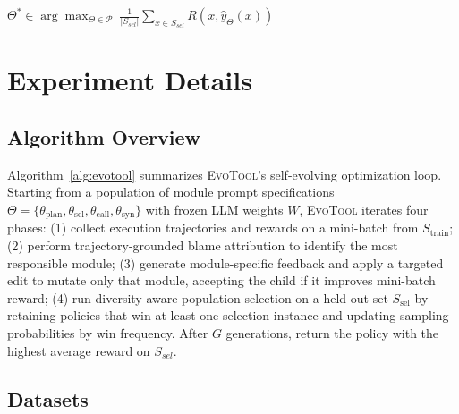 \documentclass[11pt]{article}
\begin{document}
{\begin{algorithm*}[!t]
\begin{algorithmic}[1]
\EndFor

\State \Return $\Theta^{*}\in\arg\max_{\Theta\in\mathcal{P}}\ \frac{1}{|S_{sel}|}\sum_{x\in S_{sel}} R\!\left(x,\hat{y}_{\Theta}(x)\right)$
\end{algorithmic}
\end{algorithm*}






















\section{Experiment Details}




\subsection{Algorithm Overview}
\label{app:algo}

Algorithm~\ref{alg:evotool} summarizes \textsc{EvoTool}’s self-evolving optimization loop. Starting from a population of module prompt specifications $\Theta=\{\theta_{\text{plan}},\theta_{\text{sel}},\theta_{\text{call}},\theta_{\text{syn}}\}$ with frozen LLM weights $W$, \textsc{EvoTool} iterates four phases: (1) collect execution trajectories and rewards on a mini-batch from $S_{\text{train}}$; (2) perform trajectory-grounded blame attribution to identify the most responsible module; (3) generate module-specific feedback and apply a targeted edit to mutate only that module, accepting the child if it improves mini-batch reward; (4) run diversity-aware population selection on a held-out set $S_{\text{sel}}$ by retaining policies that win at least one selection instance and updating sampling probabilities by win frequency. After $G$ generations, return the policy with the highest average reward on $S_{sel}$.}





\subsection{Datasets}
\label{app: datasets}
\end{document}

